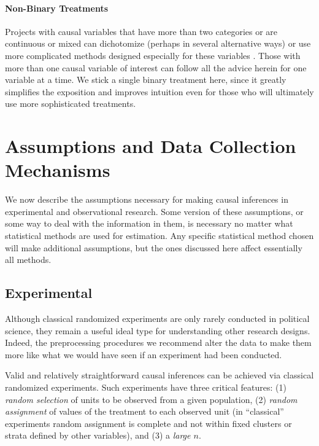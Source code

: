 \documentclass[11pt,titlepage]{article}
\begin{document}
\paragraph{Non-Binary Treatments}

Projects with causal variables that have more than two categories or
are continuous or mixed can dichotomize (perhaps in several
alternative ways) or use more complicated methods designed especially
for these variables \citep{ImaDyk04}.  Those with more than one causal
variable of interest can follow all the advice herein for one variable
at a time.  We stick a single binary treatment here, since it greatly
simplifies the exposition and improves intuition even for those who
will ultimately use more sophisticated treatments.

\section{Assumptions and Data Collection Mechanisms}

We now describe the assumptions necessary for making causal inferences
in experimental and observational research.  Some version of these
assumptions, or some way to deal with the information in them, is
necessary no matter what statistical methods are used for estimation.
Any specific statistical method chosen will make additional
assumptions, but the ones discussed here affect essentially all
methods.

\subsection{Experimental}

Although classical randomized experiments are only rarely conducted in
political science, they remain a useful ideal type for understanding
other research designs.  Indeed, the preprocessing procedures we
recommend alter the data to make them more like what we would have
seen if an experiment had been conducted.

Valid and relatively straightforward causal inferences can be achieved
via classical randomized experiments.  Such experiments have three
critical features: (1) \emph{random selection} of units to be observed
from a given population, (2) \emph{random assignment} of values of the
treatment to each observed unit (in ``classical'' experiments random
assignment is complete and not within fixed clusters or strata defined
by other variables), and (3) a \emph{large $n$}.
\end{document}
